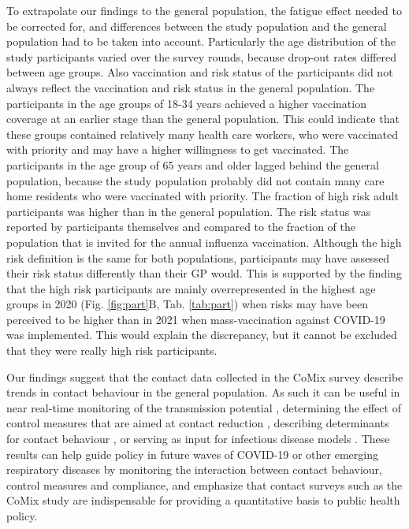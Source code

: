\documentclass[fleqn,10pt]{wlscirep}
\begin{document}
To extrapolate our findings to the general population, the fatigue effect needed to be corrected for, and differences between the study population and the general population had to be taken into account. Particularly the age distribution of the study participants varied over the survey rounds, because drop-out rates differed between age groups. Also vaccination and risk status of the participants did not always reflect the vaccination and risk status in the general population. The participants in the age groups of 18-34 years achieved a higher vaccination coverage at an earlier stage than the general population. This could indicate that these groups contained relatively many health care workers, who were vaccinated with priority and may have a higher willingness to get vaccinated. The participants in the age group of 65 years and older lagged behind the general population, because the study population probably did not contain many care home residents who were vaccinated with priority. The fraction of high risk adult participants was higher than in the general population. The risk status was reported by participants themselves and compared to the fraction of the population that is invited for the annual influenza vaccination. Although the high risk definition is the same for both populations, participants may have assessed their risk status differently than their GP would. This is supported by the finding that the high risk participants are mainly overrepresented in the highest age groups in 2020 (Fig. \ref{fig:part}B, Tab. \ref{tab:part}) when risks may have been perceived to be higher than in 2021 when mass-vaccination against COVID-19 was implemented. This would explain the discrepancy, but it cannot be excluded that they were really high risk participants. 

Our findings suggest that the contact data collected in the CoMix survey describe trends in contact behaviour in the general population. As such it can be useful in near real-time monitoring of the transmission potential \cite{Jarvis_2021, Gimma_2022}, determining the effect of control measures that are aimed at contact reduction \cite{Coletti_2020, Munday_2021}, describing determinants for contact behaviour \cite{Wambua_2022, Wong_2022a}, or serving as input for infectious disease models \cite{Coletti_2021, Franco_2022}. These results can help guide policy in future waves of COVID-19 or other emerging respiratory diseases by monitoring the interaction between contact behaviour, control measures and compliance, and emphasize that contact surveys such as the CoMix study are indispensable for providing a quantitative basis to public health policy.
\end{document}
